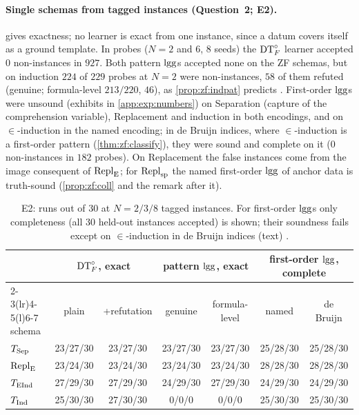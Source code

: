 \paragraph{Single schemas from tagged instances (Question~2; E2).}
 gives exactness; no learner is exact from one instance, since a datum covers itself as a ground template. In probes ($N=2$ and $6$, $8$ seeds) the $\mathrm{DT}^{\circ}_{F}$ learner accepted $0$ non-instances in $927$. Both pattern $\mathrm{lgg}$s accepted none on the ZF schemas, but on induction $224$ of $229$ probes at $N=2$ were non-instances, $58$ of them refuted (genuine; formula-level $213/220$, $46$), as \cref{prop:zf:indpat} predicts . First-order $\mathrm{lgg}$s were unsound (exhibits in \cref{app:exp:numbers}) on Separation (capture of the comprehension variable), Replacement and induction in both encodings, and on $\in$-induction in the named encoding; in de Bruijn indices, where $\in$-induction is a first-order pattern (\cref{thm:zf:classify}), they were sound and complete on it ($0$ non-instances in $182$ probes). On Replacement the false instances come from the image consequent of $\mathrm{Repl}_{\mathrm{E}}$; for $\mathrm{Repl}_{\mathrm{sp}}$ the named first-order $\mathrm{lgg}$ of anchor data is truth-sound (\cref{prop:zf:coll} and the remark after it).

\begin{table}[t]
\centering\small
\setlength{\tabcolsep}{3.5pt}
\begin{tabular}{@{}lcccccc@{}}
\toprule
 & \multicolumn{2}{c}{$\mathrm{DT}^{\circ}_{F}$, exact} & \multicolumn{2}{c}{pattern $\mathrm{lgg}$, exact} & \multicolumn{2}{c}{first-order $\mathrm{lgg}$, complete}\\
\cmidrule(lr){2-3}\cmidrule(lr){4-5}\cmidrule(l){6-7}
schema & plain & +refutation & genuine & formula-level & named & de Bruijn\\
\midrule
$T_{\mathrm{Sep}}$ & 23/27/30 & 23/27/30 & 23/27/30 & 23/27/30 & 25/28/30 & 25/28/30\\
$\mathrm{Repl}_{\mathrm{E}}$ & 23/24/30 & 23/24/30 & 23/24/30 & 23/24/30 & 28/28/30 & 28/28/30\\
$T_{\mathrm{EInd}}$ & 27/29/30 & 27/29/30 & 24/29/30 & 27/29/30 & 24/29/30 & 24/29/30\\
$T_{\mathrm{Ind}}$ & 25/30/30 & 27/30/30 & 0/0/0 & 0/0/0 & 25/30/30 & 25/30/30\\
\bottomrule
\end{tabular}
\caption{E2: runs out of $30$ at $N=2/3/8$ tagged instances. For first-order $\mathrm{lgg}$s only completeness (all $30$ held-out instances accepted) is shown; their soundness fails except on $\in$-induction in de Bruijn indices (text) .}
\label{tab:exp:e2}
\end{table}

